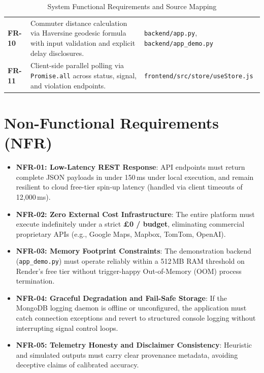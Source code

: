 \begin{table}[h!]
\begin{tabularx}{\textwidth}{l p{7.5cm} X}
\textbf{FR-10} & Commuter distance calculation via Haversine geodesic formula with input validation and explicit delay disclosures. & \texttt{backend/app.py}, \texttt{backend/app\_demo.py} \\
\textbf{FR-11} & Client-side parallel polling via \texttt{Promise.all} across status, signal, and violation endpoints. & \texttt{frontend/src/store/useStore.js} \\
\bottomrule
\end{tabularx}
\caption{System Functional Requirements and Source Mapping}
\label{tab:functional_requirements}
\end{table}

\section{Non-Functional Requirements (NFR)}
\begin{itemize}[leftmargin=*]
    \item \textbf{NFR-01: Low-Latency REST Response}: API endpoints must return complete JSON payloads in under 150\,ms under local execution, and remain resilient to cloud free-tier spin-up latency (handled via client timeouts of 12,000\,ms).
    \item \textbf{NFR-02: Zero External Cost Infrastructure}: The entire platform must execute indefinitely under a strict \textbf{\pounds 0 /  budget}, eliminating commercial proprietary APIs (e.g., Google Maps, Mapbox, TomTom, OpenAI).
    \item \textbf{NFR-03: Memory Footprint Constraints}: The demonstration backend (\texttt{app\_demo.py}) must operate reliably within a 512\,MB RAM threshold on Render's free tier without trigger-happy Out-of-Memory (OOM) process termination.
    \item \textbf{NFR-04: Graceful Degradation and Fail-Safe Storage}: If the MongoDB logging daemon is offline or unconfigured, the application must catch connection exceptions and revert to structured console logging without interrupting signal control loops.
    \item \textbf{NFR-05: Telemetry Honesty and Disclaimer Consistency}: Heuristic and simulated outputs must carry clear provenance metadata, avoiding deceptive claims of calibrated accuracy.
\end{itemize}

